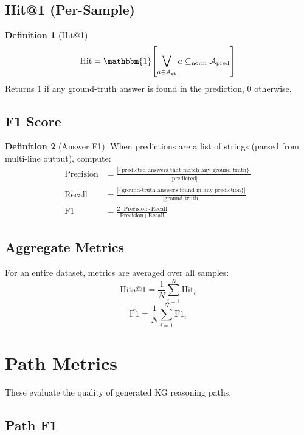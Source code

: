 \documentclass[11pt,a4paper,oneside,openany]{book}
\theoremstyle{definition}
\newtheorem{definition}{Definition}[chapter]
\begin{document}
\subsection{Hit@1 (Per-Sample)}

\begin{definition}[Hit@1]
	$$\text{Hit} = \mathbbm{1}\!\left[ \bigvee_{a \in \mathcal{A}_{\text{gt}}} a \subseteq_{\text{norm}} \mathcal{A}_{\text{pred}} \right]$$
	Returns 1 if any ground-truth answer is found in the prediction, 0 otherwise.
\end{definition}

\subsection{F1 Score}

\begin{definition}[Answer F1]
	When predictions are a list of strings (parsed from multi-line output), compute:
	\begin{align*}
		\text{Precision} & = \frac{|\{\text{predicted answers that match any ground truth}\}|}{|\text{predicted}|}   \\
		\text{Recall}    & = \frac{|\{\text{ground-truth answers found in any prediction}\}|}{|\text{ground truth}|} \\
		\text{F1}        & = \frac{2 \cdot \text{Precision} \cdot \text{Recall}}{\text{Precision} + \text{Recall}}
	\end{align*}
\end{definition}

\subsection{Aggregate Metrics}

For an entire dataset, metrics are averaged over all samples:
$$\text{Hits@1} = \frac{1}{N} \sum_{i=1}^N \text{Hit}_i$$
$$\overline{\text{F1}} = \frac{1}{N} \sum_{i=1}^N \text{F1}_i$$

\section{Path Metrics}

These evaluate the quality of generated KG reasoning paths.

\subsection{Path F1}
\end{document}
